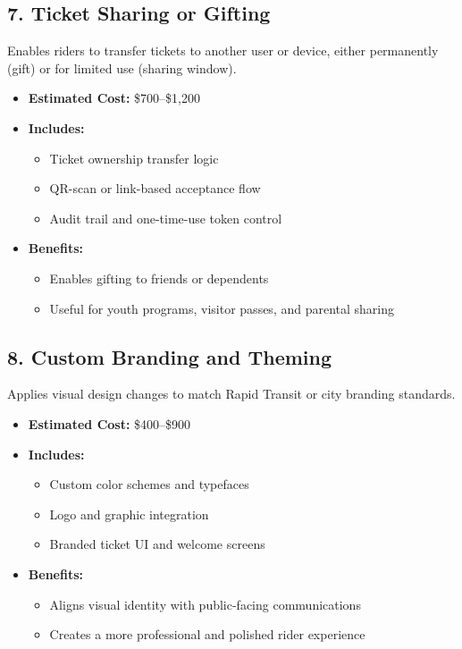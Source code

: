\documentclass[12pt]{article}
\begin{document}
\subsection*{7. Ticket Sharing or Gifting}

Enables riders to transfer tickets to another user or device, either permanently (gift) or for limited use (sharing window).

\begin{itemize}
    \item \textbf{Estimated Cost:} \$700–\$1,200
    \item \textbf{Includes:}
    \begin{itemize}
        \item Ticket ownership transfer logic
        \item QR-scan or link-based acceptance flow
        \item Audit trail and one-time-use token control
    \end{itemize}
    \item \textbf{Benefits:}
    \begin{itemize}
        \item Enables gifting to friends or dependents
        \item Useful for youth programs, visitor passes, and parental sharing
    \end{itemize}
\end{itemize}

\subsection*{8. Custom Branding and Theming}

Applies visual design changes to match Rapid Transit or city branding standards.

\begin{itemize}
    \item \textbf{Estimated Cost:} \$400–\$900
    \item \textbf{Includes:}
    \begin{itemize}
        \item Custom color schemes and typefaces
        \item Logo and graphic integration
        \item Branded ticket UI and welcome screens
    \end{itemize}
    \item \textbf{Benefits:}
    \begin{itemize}
        \item Aligns visual identity with public-facing communications
        \item Creates a more professional and polished rider experience
    \end{itemize}
\end{itemize}
\end{document}

